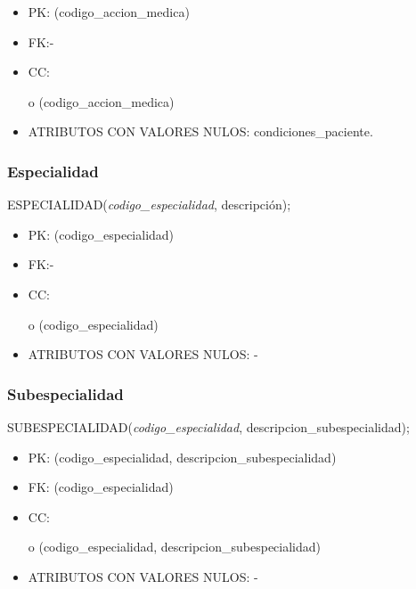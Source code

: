 \documentclass[a4paper,11pt]{article}
\begin{document}
\begin{itemize}
\item PK: (codigo\_accion\_medica)

\item FK:-

\item CC:

o (codigo\_accion\_medica)

\item ATRIBUTOS CON VALORES NULOS:  condiciones\_paciente.\label{HToc293405837}
\end{itemize}

\subsubsection{\textbf{Especialidad}}

ESPECIALIDAD(\emph{codigo\_especialidad}, descripción);

\begin{itemize}
\item PK: (codigo\_especialidad)

\item FK:-

\item CC:

o (codigo\_especialidad)

\item ATRIBUTOS CON VALORES NULOS: - \label{HToc293405838}
\end{itemize}

\subsubsection{\textbf{Subespecialidad}}

SUBESPECIALIDAD(\emph{codigo\_especialidad}, descripcion\_subespecialidad);

\begin{itemize}
\item PK: (codigo\_especialidad, descripcion\_subespecialidad)

\item FK: (codigo\_especialidad)

\item CC:

o (codigo\_especialidad, descripcion\_subespecialidad)

\item ATRIBUTOS CON VALORES NULOS: -\label{HToc293405839}
\end{itemize}
\end{document}
